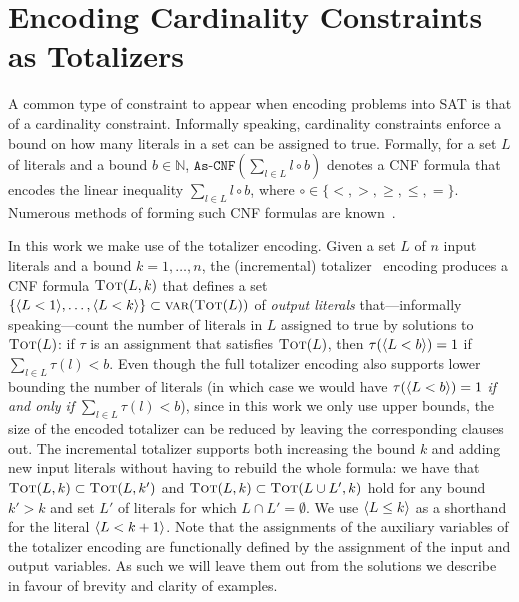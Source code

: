 \begin{example}\label{ex:maxsat-modelling}
\end{example}

\section{Encoding Cardinality Constraints as Totalizers\label{sec:card-const}}

A common type of constraint to appear when encoding problems into SAT is that of a cardinality constraint.
Informally speaking, cardinality constraints enforce a bound on how many literals in a set can be assigned to true.
Formally, for a set $L$ of literals and a bound $b \in \mathbb{N}$, $\texttt{As-CNF}\left(\sum_{l \in L} l \circ b\right)$ denotes a CNF formula that encodes the linear inequality $\sum_{l \in L} l \circ b$, where $\circ \in \{< ,> ,\geq, \leq, =\}$.
Numerous methods of forming such CNF formulas are known~\autocite{DBLP:conf/cp/BailleuxB03}.

In this work we make use of the totalizer encoding.
Given a set $L$ of $n$ input literals and a bound $k=1, \ldots, n$, the (incremental) totalizer~\autocite{DBLP:conf/cp/BailleuxB03,DBLP:conf/cp/MartinsJML14} encoding produces a CNF formula $\textsc{Tot}(L, k)$ that defines a set $\{\langle L < 1 \rangle, \ldots, \langle L < k \rangle\} \subset \textsc{var}(\textsc{Tot}(L))$ of \emph{output literals} that---informally speaking---count the number of literals in $L$ assigned to true by solutions to $\textsc{Tot}(L)$:
if $\tau$ is an assignment that satisfies $\textsc{Tot}(L)$, then $\tau(\langle L < b \rangle) = 1$ if $\sum_{l \in L} \tau(l) < b$.
Even though the full totalizer encoding also supports lower bounding the number of literals (in which case we would have $\tau(\langle L < b \rangle)=1$ \emph{if and only if} $\sum_{l \in L} \tau(l) < b$), since in this work we only use upper bounds, the size of the encoded totalizer can be reduced by leaving the corresponding clauses out.
The incremental totalizer supports both increasing the bound $k$ and adding new input literals without having to rebuild the whole formula:
we have that $\textsc{Tot}(L, k) \subset \textsc{Tot}(L, k')$ and $\textsc{Tot}(L, k) \subset  \textsc{Tot}(L \cup L', k)$ hold for any bound $k' > k$ and set $L'$ of literals for which $L \cap L' =  \emptyset$. 
We use $\langle L \leq k \rangle$ as a shorthand for the literal $\langle L < k+1 \rangle$.
Note that the assignments of the auxiliary variables of the totalizer encoding are functionally defined by the assignment of the input and output variables.
As such we will leave them out from the solutions we describe in favour of brevity and clarity of examples. 